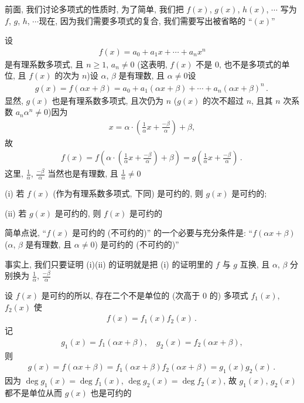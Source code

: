 前面, 我们讨论多项式的性质时, 为了简单, 我们把 $f(x)$, $g(x)$, $h(x)$, $\cdots$ 写为 $f$, $g$, $h$, $\cdots$\period 现在, 因为我们需要多项式的复合, 我们需要写出被省略的 ``$(x)$''\period

\begin{proposition}
    设
    \begin{align*}
        f(x) = a_0 + a_1 x + \cdots + a_n x^n
    \end{align*}
    是有理系数多项式, 且 $n \geq 1$, $a_n \neq 0$ (这表明, $f(x)$ 不是 $0$, 也不是多项式的单位, 且 $f(x)$ 的次为 $n$)\period 设 $\alpha$, $\beta$ 是有理数, 且 $\alpha \neq 0$\period 设
    \begin{align*}
        g(x) = f(\alpha x + \beta) = a_0 + a_1 (\alpha x + \beta) + \cdots + a_n (\alpha x + \beta)^n \period
    \end{align*}
    显然, $g(x)$ 也是有理系数多项式, 且次仍为 $n$ ($g(x)$ 的次不超过 $n$, 且其 $n$ 次系数 $a_n \alpha^n \neq 0$)\period 因为
    \begin{align*}
        x = \alpha \cdot \left( \frac{1}{\alpha} x + \frac{-\beta}{\alpha} \right) + \beta,
    \end{align*}
    故
    \begin{align*}
        f(x) = f\left( \alpha \cdot \left( \frac{1}{\alpha} x + \frac{-\beta}{\alpha} \right) + \beta \right) = g\left( \frac{1}{\alpha} x + \frac{-\beta}{\alpha} \right) \period
    \end{align*}
    这里, $\frac{1}{\alpha}$, $\frac{-\beta}{\alpha}$ 当然也是有理数, 且 $\frac{1}{\alpha} \neq 0$\period

    (i) 若 $f(x)$ (作为有理系数多项式, 下同) 是可约的, 则 $g(x)$ 是可约的;

    (ii) 若 $g(x)$ 是可约的, 则 $f(x)$ 是可约的\period

    简单点说, ``$f(x)$ 是可约的 (不可约的)'' 的一个必要与充分条件是: ``$f(\alpha x + \beta)$ ($\alpha$, $\beta$ 是有理数, 且 $\alpha \neq 0$) 是可约的 (不可约的)''\period
\end{proposition}

\begin{pf}
    事实上, 我们只要证明 (i)\period (ii) 的证明就是把 (i) 的证明里的 $f$ 与 $g$ 互换, 且 $\alpha$, $\beta$ 分别换为 $\frac{1}{\alpha}$, $\frac{-\beta}{\alpha}$\period

    设 $f(x)$ 是可约的\period 所以, 存在二个不是单位的 (次高于 $0$ 的) 多项式 $f_1 (x)$, $f_2 (x)$ 使
    \begin{align*}
        f(x) = f_1 (x) f_2 (x) \period
    \end{align*}
    记
    \begin{align*}
        g_1 (x) = f_1 (\alpha x + \beta), \quad g_2 (x) = f_2 (\alpha x + \beta),
    \end{align*}
    则
    \begin{align*}
        g(x) = f(\alpha x + \beta) = f_1 (\alpha x + \beta) f_2 (\alpha x + \beta) = g_1 (x) g_2 (x) \period
    \end{align*}
    因为 $\deg g_1 (x) = \deg f_1 (x)$, $\deg g_2 (x) = \deg f_2 (x)$, 故 $g_1 (x)$, $g_2 (x)$ 都不是单位\period 从而 $g(x)$ 也是可约的\period
\end{pf}

